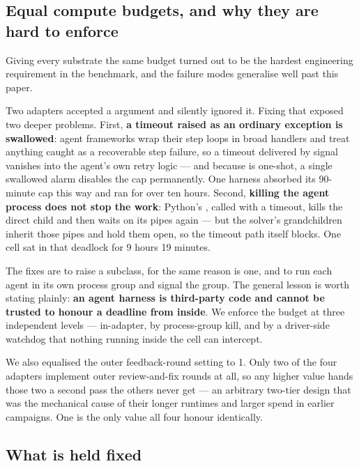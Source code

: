 \subsection{Equal compute budgets, and why they are hard to enforce}
\label{sec:budgets}

Giving every substrate the same budget turned out to be the hardest engineering
requirement in the benchmark, and the failure modes generalise well past this
paper.

Two adapters accepted a  argument and silently ignored
it. Fixing that exposed two deeper problems. First, \textbf{a timeout raised as
an ordinary exception is swallowed}: agent frameworks wrap their step loops in
broad  handlers and treat anything caught as a
recoverable step failure, so a timeout delivered by signal vanishes into the
agent's own retry logic --- and because  is one-shot, a
single swallowed alarm disables the cap permanently. One harness absorbed its
90-minute cap this way and ran for over ten hours. Second, \textbf{killing the
agent process does not stop the work}: Python's , called
with a timeout, kills the direct child and then waits on its pipes again --- but
the solver's grandchildren inherit those pipes and hold them open, so the
timeout path itself blocks. One cell sat in that deadlock for 9 hours 19
minutes.

The fixes are to raise a  subclass, for the same reason
 is one, and to run each agent in its own process group
and signal the group. The general lesson is worth stating plainly: \textbf{an
agent harness is third-party code and cannot be trusted to honour a deadline
from inside}. We enforce the budget at three independent levels --- in-adapter,
by process-group kill, and by a driver-side watchdog that nothing running inside
the cell can intercept.

We also equalised the outer feedback-round setting to 1. Only two of the four
adapters implement outer review-and-fix rounds at all, so any higher value hands
those two a second pass the others never get --- an arbitrary two-tier design
that was the mechanical cause of their longer runtimes and larger spend in
earlier campaigns. One is the only value all four honour identically.

\subsection{What is held fixed}

